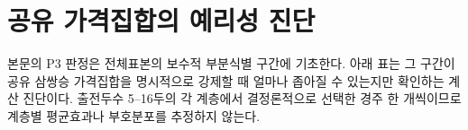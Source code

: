 \section{공유 가격집합의 예리성 진단}
\label{app:p3-sharpness}

본문의 P3 판정은 전체표본의 보수적 부분식별 구간에 기초한다. 아래 표는 그
구간이 공유 삼쌍승 가격집합을 명시적으로 강제할 때 얼마나 좁아질 수 있는지만
확인하는 계산 진단이다. 출전두수 5--16두의 각 계층에서 결정론적으로 선택한
경주 한 개씩이므로 계층별 평균효과나 부호분포를 추정하지 않는다.

\begin{table}[htbp]
\centering
\caption{P3 공유 삼쌍승 가격집합을 강제한 출전두수별 1개 대표경주 sharpness
진단. 해 상태가 ``sharp''가 아닌 행(``lower-certified'',
``upper-certified'', ``both-certified'')은 적어도 한 방향이 시간제한 때문에
최적성을 완전히 인증하지 못했음을 뜻한다. 현재 16두 대표경주는
``lower-certified''로, 하한만 certified outer bound이고 상한은 sharp하다.}
\label{tab:main-order-joint}
\resizebox{\textwidth}{!}{}
\end{table}
